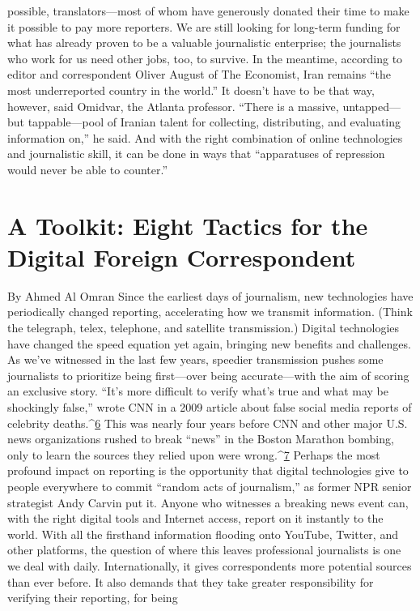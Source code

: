 possible, translators—most of whom have generously donated their time to make it
possible to pay more reporters. We are still looking for long-term funding for what has
already proven to be a valuable journalistic enterprise; the journalists who work for us
need other jobs, too, to survive.
In the meantime, according to editor and correspondent Oliver August of The Economist,
Iran remains ``the most underreported country in the world.'' It doesn’t have to be that
way, however, said Omidvar, the Atlanta professor. ``There is a massive, untapped—but
tappable—pool of Iranian talent for collecting, distributing, and evaluating information
on,'' he said. And with the right combination of online technologies and journalistic skill,
it can be done in ways that ``apparatuses of repression would never be able to counter.''
\chapter{A Toolkit: Eight Tactics for the Digital Foreign Correspondent}
By Ahmed Al Omran
Since the earliest days of journalism, new technologies have periodically changed
reporting, accelerating how we transmit information. (Think the telegraph, telex,
telephone, and satellite transmission.) Digital technologies have changed the speed
equation yet again, bringing new benefits and challenges.
As we’ve witnessed in the last few years, speedier transmission pushes some journalists
to prioritize being first—over being accurate—with the aim of scoring an exclusive story.
``It’s more difficult to verify what’s true and what may be shockingly false,'' wrote CNN
in a 2009 article about false social media reports of celebrity deaths.^{\href{#endnotes}{6}} This was nearly
four years before CNN and other major U.S. news organizations rushed to break ``news''
in the Boston Marathon bombing, only to learn the sources they relied upon were wrong.^{\href{#endnotes}{7}}
Perhaps the most profound impact on reporting is the opportunity that digital
technologies give to people everywhere to commit ``random acts of journalism,'' as
former NPR senior strategist Andy Carvin put it. Anyone who witnesses a breaking news
event can, with the right digital tools and Internet access, report on it instantly to the
world. With all the firsthand information flooding onto YouTube, Twitter, and other
platforms, the question of where this leaves professional journalists is one we deal with
daily. Internationally, it gives correspondents more potential sources than ever before. It
also demands that they take greater responsibility for verifying their reporting, for being
